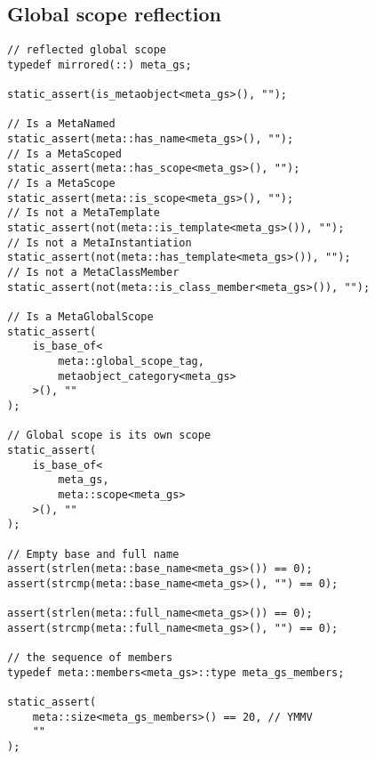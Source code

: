 
\subsection{Global scope reflection}

\begin{verbatim}
// reflected global scope
typedef mirrored(::) meta_gs;

static_assert(is_metaobject<meta_gs>(), "");

// Is a MetaNamed
static_assert(meta::has_name<meta_gs>(), "");
// Is a MetaScoped
static_assert(meta::has_scope<meta_gs>(), "");
// Is a MetaScope
static_assert(meta::is_scope<meta_gs>(), "");
// Is not a MetaTemplate
static_assert(not(meta::is_template<meta_gs>()), "");
// Is not a MetaInstantiation
static_assert(not(meta::has_template<meta_gs>()), "");
// Is not a MetaClassMember
static_assert(not(meta::is_class_member<meta_gs>()), "");

// Is a MetaGlobalScope
static_assert(
	is_base_of<
		meta::global_scope_tag,
		metaobject_category<meta_gs>
	>(), ""
);

// Global scope is its own scope
static_assert(
	is_base_of<
		meta_gs,
		meta::scope<meta_gs>
	>(), ""
);

// Empty base and full name
assert(strlen(meta::base_name<meta_gs>()) == 0);
assert(strcmp(meta::base_name<meta_gs>(), "") == 0);

assert(strlen(meta::full_name<meta_gs>()) == 0);
assert(strcmp(meta::full_name<meta_gs>(), "") == 0);

// the sequence of members
typedef meta::members<meta_gs>::type meta_gs_members;

static_assert(
	meta::size<meta_gs_members>() == 20, // YMMV
	""
);

\end{verbatim}


